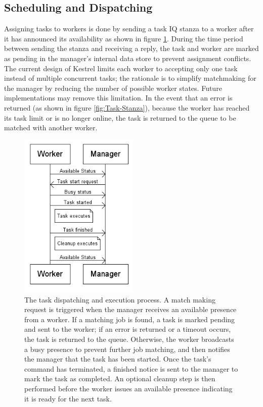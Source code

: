 \subsection{Scheduling and Dispatching}

\label{sec:Task-Dispatch} Assigning tasks to workers is done
by sending a task IQ stanza to a worker after it has announced its
availability as shown in figure \ref{fig:Task-dispatching}. During
the time period between sending the stanza and receiving a reply,
the task and worker are marked as pending in the manager's internal
data store to prevent assignment conflicts. The current design of
Kestrel limits each worker to accepting only one task instead of multiple
concurrent tasks; the rationale is to simplify matchmaking for the
manager by reducing the number of possible worker states. Future implementations
may remove this limitation. In the event that an error is returned
(as shown in figure \ref{fig:Task-Stanza}), because the worker has
reached its task limit or is no longer online, the task is returned
to the queue to be matched with another worker.

%
\begin{figure}
\includegraphics[height=8cm]{figures/dispatch}
\caption{\label{fig:Task-dispatching}The task dispatching and execution process.
A match making request is triggered when the manager receives an available
presence from a worker. If a matching job is found, a task is marked
pending and sent to the worker; if an error is returned or a timeout
occurs, the task is returned to the queue. Otherwise, the worker broadcasts
a busy presence to prevent further job matching, and then notifies
the manager that the task has been started. Once the task's command
has terminated, a finished notice is sent to the manager to mark the
task as completed. An optional cleanup step is then performed before
the worker issues an available presence indicating it is ready for
the next task.}
\end{figure}

